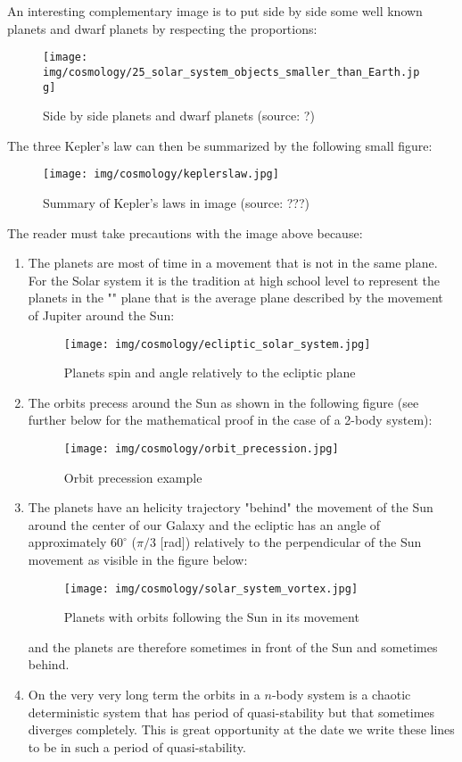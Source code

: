 	An interesting complementary image is to put side by side some well known planets and dwarf planets by respecting the proportions:
	\begin{figure}[H]
		\centering
		\texttt{[image: img/cosmology/25\_solar\_system\_objects\_smaller\_than\_Earth.jpg]}
		\caption[Side by side planets and dwarf planets]{Side by side planets and dwarf planets (source: ?)}
	\end{figure}
	The three Kepler's law can then be summarized by the following small figure:
	\begin{figure}[H]
		\centering
		\texttt{[image: img/cosmology/keplerslaw.jpg]}	
		\caption[Summary of Kepler's laws in image]{Summary of Kepler's laws in image (source: ???)}
	\end{figure}
	
	The reader must take precautions with the image above because:
	\begin{enumerate}
		\item The planets are most of time in a movement that is not in the same plane. For the Solar system it is the tradition  at high school level to represent the planets in the "" plane that is the average plane described by the movement of Jupiter around the Sun:
		\begin{figure}[H]
			\centering
			\texttt{[image: img/cosmology/ecliptic\_solar\_system.jpg]}	
			\caption{Planets spin and angle relatively to the ecliptic plane}
		\end{figure}
		
		\item The orbits precess around the Sun as shown in the following figure (see further below for the mathematical proof in the case of a 2-body system):
		\begin{figure}[H]
			\centering
			\texttt{[image: img/cosmology/orbit\_precession.jpg]}	
			\caption{Orbit precession example}
		\end{figure}
		
		\item The planets have an helicity trajectory "behind" the movement of the Sun around the center of our Galaxy and the ecliptic has an angle of approximately $60^\circ$ ($\pi/3$ [rad]) relatively to the perpendicular of the Sun movement as visible in the figure below:
		\begin{figure}[H]
			\centering
			\texttt{[image: img/cosmology/solar\_system\_vortex.jpg]}	
			\caption{Planets with orbits following the Sun in its movement}
		\end{figure}
		and the planets are therefore sometimes in front of the Sun and sometimes behind.
		
		\item On the very very long term the orbits in a $n$-body system is a chaotic deterministic system that has period of quasi-stability but that sometimes diverges completely. This is great opportunity at the date we write these lines to be in such a period of quasi-stability.
	\end{enumerate}	
	
